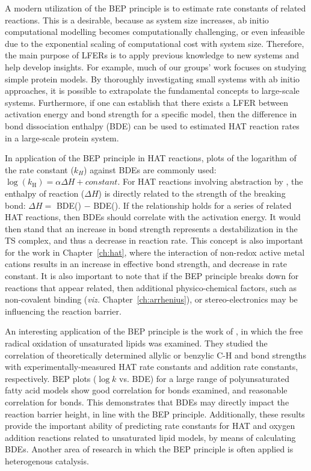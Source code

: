 A modern utilization of the BEP principle is to estimate rate constants of related reactions. This is a desirable, because as system size increases, ab initio computational modelling becomes computationally challenging, or even infeasible due to the exponential scaling of computational cost with system size. Therefore, the main purpose of LFERs is to apply previous knowledge to new systems and help develop insights. For example, much of our groups' work focuses on studying simple protein models. By thoroughly investigating small systems with ab initio approaches, it is possible to extrapolate the fundamental concepts to large-scale systems. Furthermore, if one can establish that there exists a LFER between activation energy and bond strength for a specific model, then the difference in bond dissociation enthalpy (BDE) can be used to estimated HAT reaction rates in a large-scale protein system.

In application of the BEP principle in HAT reactions, plots of the logarithm of the rate constant ($k_H$) against BDEs are commonly used: $\log(k_\mathrm{H}) = \alpha \Delta H + constant$. For HAT reactions involving abstraction by \cumo, the enthalpy of reaction ($\Delta H$) is directly related to the strength of the breaking bond: $\Delta H =$ BDE() $-$ BDE(). If the relationship holds for a series of related HAT reactions, then BDEs should correlate with the activation energy. It would then stand that an increase in bond strength represents a destabilization in the TS complex, and thus a decrease in reaction rate. This concept is also important for the work in Chapter~\ref{ch:hat}, where the interaction of non-redox active metal cations results in an increase in effective bond strength, and decrease in rate constant. It is also important to note that if the BEP principle breaks down for reactions that appear related, then additional physico-chemical factors, such as non-covalent binding (\emph{viz.} Chapter~\ref{ch:arrhenius}), or stereo-electronics may be influencing the reaction barrier.

An interesting application of the BEP principle is the work of \citet{Pratt2003}, in which the free radical oxidation of unsaturated lipids was examined. They studied the correlation of theoretically determined allylic or benzylic C-H and  bond strengths with experimentally-measured HAT rate constants and  addition rate constants, respectively. BEP plots ($\log k$ vs. BDE) for a large range of polyunsaturated fatty acid models show good correlation for  bonds examined, and reasonable correlation for  bonds. This demonstrates that BDEs may directly impact the reaction barrier height, in line with the BEP principle. Additionally, these results provide the important ability of predicting rate constants for HAT and oxygen addition reactions related to unsaturated lipid models, by means of calculating BDEs. Another area of research in which the BEP principle is often applied is heterogenous catalysis.\cite{Panov2015}

